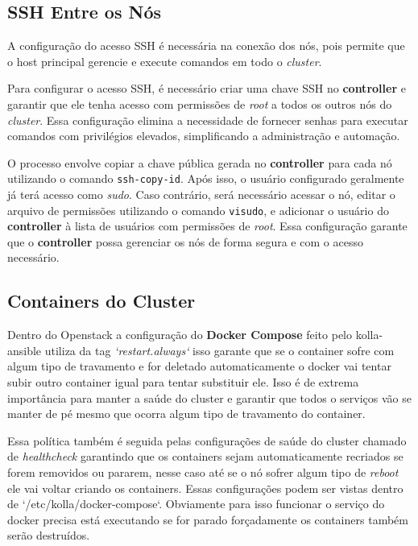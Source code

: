 \subsection{SSH Entre os Nós}
A configuração do acesso SSH é necessária na conexão dos nós, pois permite que o host principal gerencie e execute comandos em todo o \textit{cluster}.

Para configurar o acesso SSH, é necessário criar uma chave SSH no \textbf{controller} e garantir que ele tenha acesso com permissões de \textit{root} a todos os outros nós do \textit{cluster}. Essa configuração elimina a necessidade de fornecer senhas para executar comandos com privilégios elevados, simplificando a administração e automação.

O processo envolve copiar a chave pública gerada no \textbf{controller} para cada nó utilizando o comando \texttt{ssh-copy-id}. Após isso, o usuário configurado geralmente já terá acesso como \textit{sudo}. Caso contrário, será necessário acessar o nó, editar o arquivo de permissões utilizando o comando \texttt{visudo}, e adicionar o usuário do \textbf{controller} à lista de usuários com permissões de \textit{root}. Essa configuração garante que o \textbf{controller} possa gerenciar os nós de forma segura e com o acesso necessário.


\subsection {Containers do Cluster}
Dentro do Openstack a configuração do \textbf{Docker Compose} feito pelo kolla-ansible utiliza da tag \textit{`restart.always`} isso garante que se o container sofre com algum tipo de travamento e for deletado automaticamente o docker vai tentar subir outro container igual para tentar substituir ele. Isso é de extrema importância para manter a saúde do cluster e garantir que todos o serviços vão se manter de pé mesmo que ocorra algum tipo de travamento do container.

Essa política também é seguida pelas configurações de saúde do cluster chamado de \textit{healthcheck} garantindo que os containers sejam automaticamente recriados se forem removidos ou pararem, nesse caso até se o nó sofrer algum tipo de \textit{reboot} ele vai voltar criando os containers. Essas configurações podem ser vistas dentro de `/etc/kolla/docker-compose`. Obviamente para isso funcionar o serviço do docker precisa está executando se for parado forçadamente os containers também serão destruídos.

